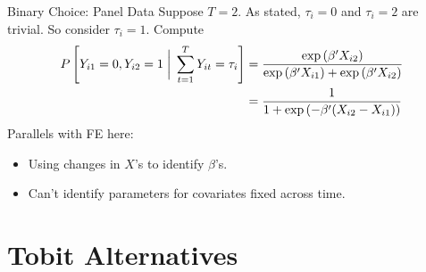 \documentclass[aspectratio=169, handout]{beamer}
\newcommand{\sumtT}{\sum^T_{t=1}}
\begin{document}
\begin{frame}[shrink]{Binary Choice: Panel Data}
Suppose $T=2$.
As stated, $\tau_i=0$ and $\tau_i=2$ are trivial.
So consider $\tau_i=1$.
Compute
\begin{align*}
  P\left[
  Y_{i1}=0,Y_{i2}=1
  \;\bigg|\;
  \sumtT
  Y_{it}
  =
  \tau_i
  \right]
  &=
  \frac{%
    \exp\left(
    \beta' X_{i2}
    \right)
  }{%
    \exp\left(
    \beta'X_{i1}
    \right)
    +
    \exp\left(
    \beta'X_{i2}
    \right)
  }
  \\
  &=
  \frac{%
    1
  }{%
    1+
    \exp\left(
    -\beta'(X_{i2}-X_{i1})
    \right)
  }
\end{align*}
Parallels with FE here:
\begin{itemize}
  \item Using changes in $X$'s to identify $\beta$'s.
  \item Can't identify parameters for covariates fixed across time.
\end{itemize}
\end{frame}






\section{Tobit Alternatives}

\end{document}
